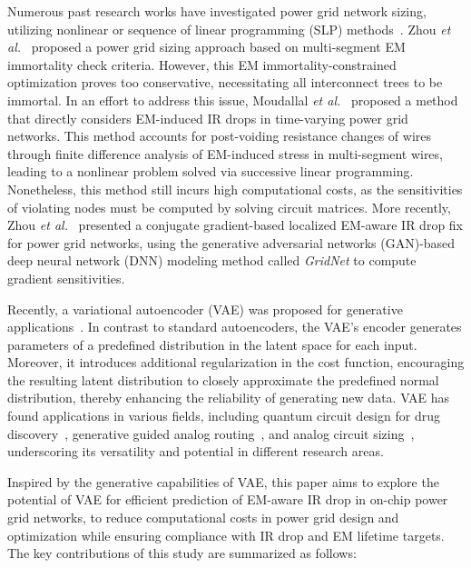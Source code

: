 Numerous past research works have investigated power grid network sizing, utilizing nonlinear or sequence of linear programming (SLP) methods~\cite{ChBr:TCAD'88,DuMa:DAC'89,Tan:DAC'99,Wang:TCAD'05,ZhouSun:TVLSI'19, Sukharev:2019pg,ZhouYu:ASPDAC'20,ZhouJin:ICCAD'20}. Zhou {\it et al.}~\cite{ZhouSun:TVLSI'19,ZhouChen:Integration'21} proposed a power grid sizing approach based on multi-segment EM immortality check criteria. However, this EM immortality-constrained optimization proves too conservative, necessitating all interconnect trees to be immortal. In an effort to address this issue, Moudallal {\it et al.}~\cite{Sukharev:2019pg} proposed a method that directly considers EM-induced IR drops in time-varying power grid networks. This method accounts for post-voiding resistance changes of wires through finite difference analysis of EM-induced stress in multi-segment wires, leading to a nonlinear problem solved via successive linear programming. Nonetheless, this method still incurs high computational costs, as the sensitivities of violating nodes must be computed by solving circuit matrices. More recently, Zhou {\it et al.}~\cite{ZhouJin:ICCAD'20, HanLiu:TCAD'22-23} presented a conjugate gradient-based localized EM-aware IR drop fix for power grid networks, using the generative adversarial networks (GAN)-based deep neural network (DNN) modeling method called {\it GridNet} to compute gradient sensitivities.


Recently, a variational autoencoder (VAE) was proposed for generative applications~\cite{Diederik:arxiv'22}. In contrast to standard autoencoders, the VAE's encoder generates parameters of a predefined distribution in the latent space for each input. Moreover, it introduces additional regularization in the cost function, encouraging the resulting latent distribution to closely approximate the predefined normal distribution, thereby enhancing the reliability of generating new data. VAE has found applications in various fields, including quantum circuit design for drug discovery~\cite{Li:DATE'22}, generative guided analog routing~\cite{Zhu:ICCAD'19}, and analog circuit sizing~\cite{Touloupas:SMACD'22}, underscoring its versatility and potential in different research areas.


Inspired by the generative capabilities of VAE, this paper aims to explore the potential of VAE for efficient prediction of EM-aware IR drop in on-chip power grid networks, to reduce computational costs in power grid design and optimization while ensuring compliance with IR drop and EM lifetime targets. The key contributions of this study are summarized as follows:

